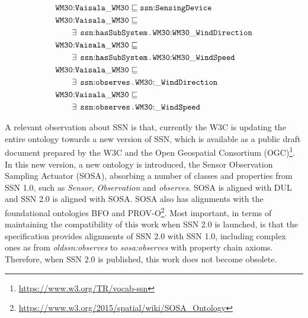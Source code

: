 \documentclass{sig-alternate-05-2015}
\newcommand{\erestr}[2]{\exists\;\,{\tt #1}\,.\,{\tt #2}}
\begin{document}
\begin{align*}
  \begin{aligned}
	&\node{WM30}{Vaisala\-\_WM30} \sqsubseteq \node{ssn}{SensingDevice}\\
	&\node{WM30}{Vaisala\-\_WM30} \sqsubseteq\\
	&\qquad\erestr{\node{ssn}{hasSubSystem}}{\node{WM30}{WM30\-\_Wind\-Direction}}\\
	&\node{WM30}{Vaisala\-\_WM30} \sqsubseteq\\
	&\qquad\erestr{\node{ssn}{hasSubSystem}}{\node{WM30}{WM30\-\_WindSpeed}}\\	
	&\node{WM30}{Vaisala\-\_WM30} \sqsubseteq\\
	&\qquad\erestr{\node{ssn}{observes}}{\node{WM30}{\_WindDirection}}\\
	&\node{WM30}{Vaisala\-\_WM30} \sqsubseteq\\
	&\qquad\erestr{\node{ssn}{observes}}{\node{WM30}{\_WindSpeed}}\\
  \end{aligned}
\end{align*}

A relevant observation about SSN is that, currently the W3C is updating the entire ontology towards a new version of SSN, which is available as a public draft document prepared by the W3C and the Open Geospatial Consortium (OGC)\footnote{\url{https://www.w3.org/TR/vocab-ssn}}. In this new version, a new ontology is introduced, the Sensor Observation Sampling Actuator (SOSA), absorbing a number of classes and properties from SSN 1.0, such as \textit{Sensor}, \textit{Observation} and \textit{observes}. SOSA is aligned with DUL and SSN 2.0 is aligned with SOSA. SOSA also has alignments with the foundational ontologies BFO and PROV-O\footnote{\url{https://www.w3.org/2015/spatial/wiki/SOSA_Ontology}}. Most important, in terms of maintaining the compatibility of this work when SSN 2.0 is launched, is that the specification provides alignments of SSN 2.0 with SSN 1.0, including complex ones as from \textit{oldssn:observes} to \textit{sosa:observes} with property chain axioms. Therefore, when SSN 2.0 is published, this work does not become obsolete.

\end{document}
